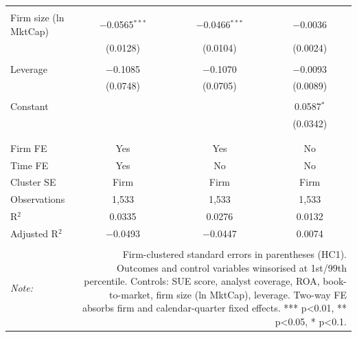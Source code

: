 \begin{table}[!htbp]
\begin{tabular}{@{\extracolsep{5pt}}lccc}
  & & & \\ 
 Firm size (ln MktCap) & $-$0.0565$^{***}$ & $-$0.0466$^{***}$ & $-$0.0036 \\ 
  & (0.0128) & (0.0104) & (0.0024) \\ 
  & & & \\ 
 Leverage & $-$0.1085 & $-$0.1070 & $-$0.0093 \\ 
  & (0.0748) & (0.0705) & (0.0089) \\ 
  & & & \\ 
 Constant &  &  & 0.0587$^{*}$ \\ 
  &  &  & (0.0342) \\ 
  & & & \\ 
\hline \\[-1.8ex] 
Firm FE & Yes & Yes & No \\ 
Time FE & Yes & No & No \\ 
Cluster SE & Firm & Firm & Firm \\ 
Observations & 1,533 & 1,533 & 1,533 \\ 
R$^{2}$ & 0.0335 & 0.0276 & 0.0132 \\ 
Adjusted R$^{2}$ & $-$0.0493 & $-$0.0447 & 0.0074 \\ 
\hline 
\hline \\[-1.8ex] 
\textit{Note:}  & \multicolumn{3}{r}{Firm-clustered standard errors in parentheses (HC1). Outcomes and control variables winsorised at 1st/99th percentile. Controls: SUE score, analyst coverage, ROA, book-to-market, firm size (ln MktCap), leverage. Two-way FE absorbs firm and calendar-quarter fixed effects. *** p<0.01, ** p<0.05, * p<0.1.} \\ 
\end{tabular} 
\end{table} 
